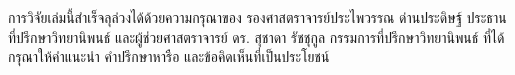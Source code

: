 

\cleardoublepage
\setcounter{savepage}{\thepage}
\begin{abstractpage}

\end{abstractpage}

% 

\cleardoublepage

\begin{acknowledgement}
\par{
การวิจัยเล่มนี้สำเร็จลุล่วงได้ด้วยความกรุณาของ รองศาสตราจารย์ประไพวรรณ ด่านประดิษฐ์ ประธานที่ปรึกษาวิทยานิพนธ์
และผู้ช่วยศาสตราจารย์ ดร. สุชาดา รัชชุกูล  กรรมการที่ปรึกษาวิทยานิพนธ์ ที่ได้กรุณาให้คำแนะนำ คำปรึกษาหารือ และข้อคิดเห็นที่เป็นประโยชน์
}
\end{acknowledgement}

